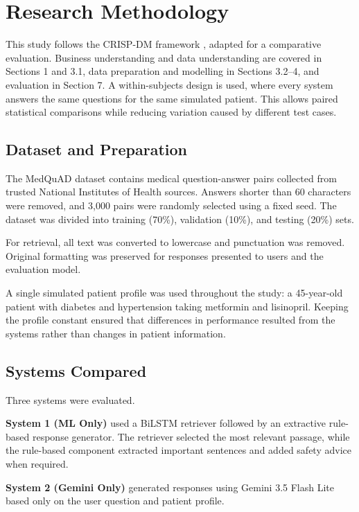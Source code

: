 \section{Research Methodology}
\label{sec:Methodology}

This study follows the CRISP-DM framework \citep{wirth2000}, adapted for a comparative evaluation. Business understanding and data understanding are covered in Sections 1 and 3.1, data preparation and modelling in Sections 3.2--4, and evaluation in Section 7. A within-subjects design is used, where every system answers the same questions for the same simulated patient. This allows paired statistical comparisons while reducing variation caused by different test cases.

\subsection{Dataset and Preparation}

The MedQuAD dataset \citep{abacha2019} contains medical question-answer pairs collected from trusted National Institutes of Health sources. Answers shorter than 60 characters were removed, and 3,000 pairs were randomly selected using a fixed seed. The dataset was divided into training (70\%), validation (10\%), and testing (20\%) sets.

For retrieval, all text was converted to lowercase and punctuation was removed. Original formatting was preserved for responses presented to users and the evaluation model.

A single simulated patient profile was used throughout the study: a 45-year-old patient with diabetes and hypertension taking metformin and lisinopril. Keeping the profile constant ensured that differences in performance resulted from the systems rather than changes in patient information.

\subsection{Systems Compared}

Three systems were evaluated.

\textbf{System 1 (ML Only)} used a BiLSTM retriever followed by an extractive rule-based response generator. The retriever selected the most relevant passage, while the rule-based component extracted important sentences and added safety advice when required.

\textbf{System 2 (Gemini Only)} generated responses using Gemini 3.5 Flash Lite based only on the user question and patient profile.

